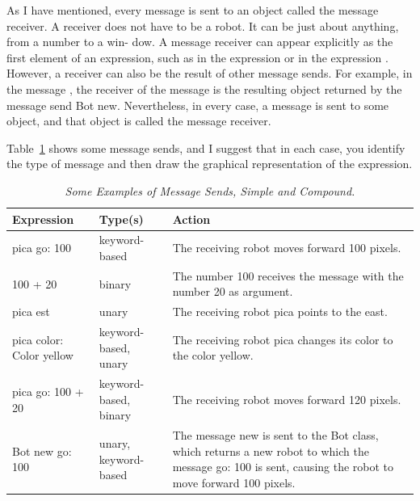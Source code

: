 \documentclass[a4paper,10pt,twoside]{book}
\begin{document}

As I have mentioned, every message is sent to an object called the message receiver. A 
receiver does not have to be a robot. It can be just about anything, from a number to a win- 
dow. A message receiver can appear explicitly as the first element of an expression, such as 
 in the expression  or  in the expression . However, a receiver 
can also be the result of other message sends. For example, in the message , 
the receiver of the message  is the resulting object returned by the message send Bot 
new. Nevertheless, in every case, a message is sent to some object, and that object is called the 
message receiver. 


Table~\ref{tab1101} shows some message sends, and I suggest that in each case, you identify the 
type of message and then draw the graphical representation of the expression.

 \begin{table}[h]
 \caption{\emph{Some Examples of Message Sends, Simple and Compound.}\label{tab1101}}
 \begin{center}
 {\small \begin{tabular}{p{23mm}p{28mm}p{50mm}}
 \hline
 \textbf{Expression} & \textbf{Type(s)} & \textbf{Action}\\ \hline
 \textsf{pica go: 100} & keyword-based & The receiving robot moves forward 100 pixels. \\
 \textsf{100 + 20} & binary & The number 100 receives the message with the number 20 as argument.\\
 \textsf{pica est} & unary & The receiving robot \textsf{pica} points to the \textsf{east}. \\
 \textsf{pica color: Color yellow} & keyword-based, unary & The receiving robot \textsf{pica} changes its color to the color yellow.\\
 \textsf{pica go: 100 + 20} & keyword-based, binary & The receiving robot moves forward 120 pixels.\\
 \textsf{Bot new go: 100} & unary, keyword-based & The message \textsf{new} is sent to the Bot class, 
 which returns a new robot to which the message \textsf{go: 100} is sent, causing the robot to move forward 100 pixels. \\
 \hline
 \end{tabular}}
 \end{center}
 \end{table}
\end{document}
